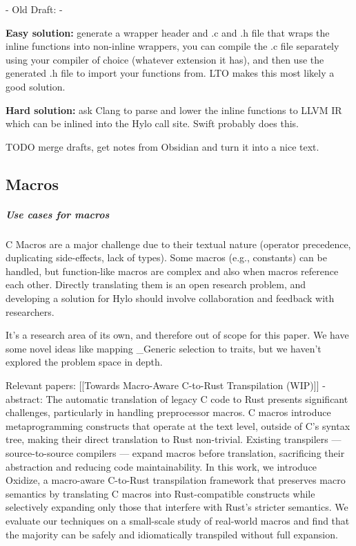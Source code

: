 - Old Draft: - 

\textbf{Easy solution:} generate a wrapper header and .c and .h file that wraps the inline functions into non-inline wrappers, you can compile the .c file separately using your compiler of choice (whatever extension it has), and then use the generated .h file to import your functions from. LTO makes this most likely a good solution.

\textbf{Hard solution:} ask Clang to parse and lower the inline functions to LLVM IR which can be inlined into the Hylo call site. Swift probably does this.

TODO merge drafts, get notes from Obsidian and turn it into a nice text.

\subsection{Macros}

\subparagraph{Use cases for macros}
C Macros are a major challenge due to their textual nature (operator precedence, duplicating side-effects, lack of types).
Some macros (e.g., constants) can be handled, but function-like macros are complex and also when macros reference each other.
Directly translating them is an open research problem, and developing a solution for Hylo should involve collaboration and feedback with researchers.


It's a research area of its own, and therefore out of scope for this paper. We have some novel ideas like mapping \_Generic selection to traits, but we haven't explored the problem space in depth.

Relevant papers:
[[Towards Macro-Aware C-to-Rust Transpilation (WIP)]]
 - abstract: The automatic translation of legacy C code to Rust presents significant challenges, particularly in handling preprocessor macros. C macros introduce metaprogramming constructs that operate at the text level, outside of C's syntax tree, making their direct translation to Rust non-trivial. Existing transpilers --- source-to-source compilers --- expand macros before translation, sacrificing their abstraction and reducing code maintainability. In this work, we introduce Oxidize, a macro-aware C-to-Rust transpilation framework that preserves macro semantics by translating C macros into Rust-compatible constructs while selectively expanding only those that interfere with Rust's stricter semantics. We evaluate our techniques on a small-scale study of real-world macros and find that the majority can be safely and idiomatically transpiled without full expansion.

